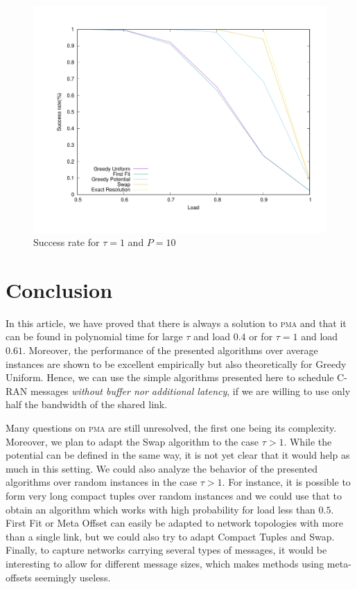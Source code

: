 \documentclass[a4paper,UKenglish,cleveref, autoref, thm-restate]{lipics-v2019}
\newcommand\pma{\textsc{pma}\xspace}
\begin{document}
\begin{figure}
\begin{center}
\includegraphics[scale=0.3]{tau110}
\end{center}
\caption{Success rate for $\tau = 1$ and $P=10$}
\label{fig:tau1-10mess}
\end{figure}

\section{Conclusion}

In this article, we have proved that there is always a solution to \pma and that it can be found in polynomial time 
for large $\tau$ and load  $0.4$ or for $\tau = 1$ and load $0.61$. Moreover, the performance of the presented algorithms over average instances are shown to be excellent empirically but also theoretically for Greedy Uniform.
Hence, we can use the simple algorithms presented here to schedule C-RAN messages \emph{without buffer nor additional latency}, if we are willing to use only half the bandwidth of the shared link. 

Many questions on \pma are still unresolved, the first one being its complexity.
Moreover, we plan to adapt the Swap algorithm to the case $\tau > 1$. While the potential
can be defined in the same way, it is not yet clear that it would help as much in this setting.
We could also analyze the behavior of the presented algorithms over random instances in the case $\tau > 1$.
For instance, it is possible to form very long compact tuples over random instances and we could
use that to obtain an algorithm which works with high probability for load less than $0.5$. 
First Fit or Meta Offset can easily be adapted to network topologies with more than a single link, but we could also try to adapt Compact Tuples and Swap. Finally, to capture networks carrying several types of messages, it would be interesting to allow for different message sizes, which makes methods using meta-offsets seemingly useless.
\end{document}
